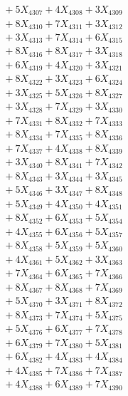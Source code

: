 \documentclass[a4paper,10pt]{article}
\begin{document}
{\begin{align}
&\;  + 5 X_{4307} + 4 X_{4308} + 3 X_{4309} \\[0.3ex]
&\;  + 8 X_{4310} + 7 X_{4311} + 3 X_{4312} \\[0.3ex]
&\;  + 3 X_{4313} + 7 X_{4314} + 6 X_{4315} \\[0.3ex]
&\;  + 8 X_{4316} + 8 X_{4317} + 3 X_{4318} \\[0.3ex]
&\;  + 6 X_{4319} + 4 X_{4320} + 3 X_{4321} \\[0.3ex]
&\;  + 8 X_{4322} + 3 X_{4323} + 6 X_{4324} \\[0.3ex]
&\;  + 3 X_{4325} + 5 X_{4326} + 8 X_{4327} \\[0.3ex]
&\;  + 3 X_{4328} + 7 X_{4329} + 3 X_{4330} \\[0.5ex]\allowbreak
&\;  + 7 X_{4331} + 8 X_{4332} + 7 X_{4333} \\[0.3ex]
&\;  + 8 X_{4334} + 7 X_{4335} + 8 X_{4336} \\[0.3ex]
&\;  + 7 X_{4337} + 4 X_{4338} + 8 X_{4339} \\[0.3ex]
&\;  + 3 X_{4340} + 8 X_{4341} + 7 X_{4342} \\[0.3ex]
&\;  + 8 X_{4343} + 3 X_{4344} + 3 X_{4345} \\[0.3ex]
&\;  + 5 X_{4346} + 3 X_{4347} + 8 X_{4348} \\[0.3ex]
&\;  + 5 X_{4349} + 4 X_{4350} + 4 X_{4351} \\[0.3ex]
&\;  + 8 X_{4352} + 6 X_{4353} + 5 X_{4354} \\[0.3ex]
&\;  + 4 X_{4355} + 6 X_{4356} + 5 X_{4357} \\[0.3ex]
&\;  + 8 X_{4358} + 5 X_{4359} + 5 X_{4360} \\[0.5ex]\allowbreak
&\;  + 4 X_{4361} + 5 X_{4362} + 3 X_{4363} \\[0.3ex]
&\;  + 7 X_{4364} + 6 X_{4365} + 7 X_{4366} \\[0.3ex]
&\;  + 8 X_{4367} + 8 X_{4368} + 7 X_{4369} \\[0.3ex]
&\;  + 5 X_{4370} + 3 X_{4371} + 8 X_{4372} \\[0.3ex]
&\;  + 8 X_{4373} + 7 X_{4374} + 5 X_{4375} \\[0.3ex]
&\;  + 5 X_{4376} + 6 X_{4377} + 7 X_{4378} \\[0.3ex]
&\;  + 6 X_{4379} + 7 X_{4380} + 5 X_{4381} \\[0.3ex]
&\;  + 6 X_{4382} + 4 X_{4383} + 4 X_{4384} \\[0.3ex]
&\;  + 4 X_{4385} + 7 X_{4386} + 7 X_{4387} \\[0.3ex]
&\;  + 4 X_{4388} + 6 X_{4389} + 7 X_{4390} \\[0.5ex]\allowbreak

\end{align}}
\end{document}
